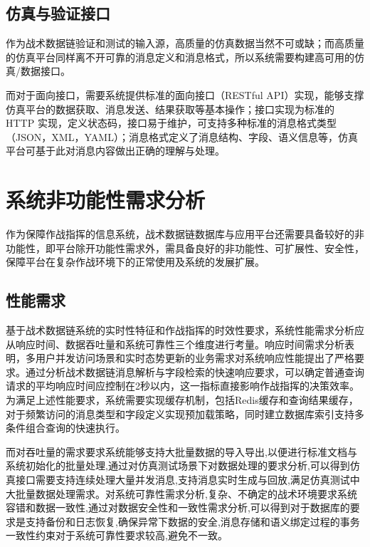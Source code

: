 \subsection{仿真与验证接口}
作为战术数据链验证和测试的输入源，高质量的仿真数据当然不可或缺；而高质量的仿真平台同样离不开可靠的消息定义和消息格式，所以系统需要构建高可用的仿真/数据接口。

而对于面向接口，需要系统提供标准的面向接口（RESTful API）实现，能够支撑仿真平台的数据获取、消息发送、结果获取等基本操作；接口实现为标准的 HTTP 实现，定义状态码，接口易于维护，可支持多种标准的消息格式类型（JSON，XML，YAML）；消息格式定义了消息结构、字段、语义信息等，仿真平台可基于此对消息内容做出正确的理解与处理。

\section{系统非功能性需求分析}

作为保障作战指挥的信息系统，战术数据链数据库与应用平台还需要具备较好的非功能性，即平台除开功能性需求外，需具备良好的非功能性、可扩展性、安全性，保障平台在复杂作战环境下的正常使用及系统的发展扩展\cite{Kagioglidis_2009}。

\subsection{性能需求}
基于战术数据链系统的实时性特征和作战指挥的时效性要求，系统性能需求分析应从响应时间、数据吞吐量和系统可靠性三个维度进行考量\cite{Kee_2008,baek2016_adhoc,baek2019_jsyst_timemirror}。响应时间需求分析表明，多用户并发访问场景和实时态势更新的业务需求对系统响应性能提出了严格要求。通过分析战术数据链消息解析与字段检索的快速响应要求，可以确定普通查询请求的平均响应时间应控制在2秒以内，这一指标直接影响作战指挥的决策效率。为满足上述性能要求，系统需要实现缓存机制，包括Redis缓存和查询结果缓存，对于频繁访问的消息类型和字段定义实现预加载策略，同时建立数据库索引支持多条件组合查询的快速执行。

而对吞吐量的需求要求系统能够支持大批量数据的导入导出,以便进行标准文档与系统初始化的批量处理,通过对仿真测试场景下对数据处理的要求分析,可以得到仿真接口需要支持连续处理大量并发消息,支持消息实时生成与回放,满足仿真测试中大批量数据处理需求\cite{lee2018_jsyst,Spyridis_2010,Kopp_Throughput_Enhanced_JTIDS_2006,Juarez_2025}。对系统可靠性需求分析,复杂、不确定的战术环境要求系统容错和数据一致性,通过对数据安全性和一致性需求分析,可以得到对于数据库的要求是支持备份和日志恢复,确保异常下数据的安全,消息存储和语义绑定过程的事务一致性约束对于系统可靠性要求较高,避免不一致\cite{Koromilas_2009,EverythingRF_STT}。

